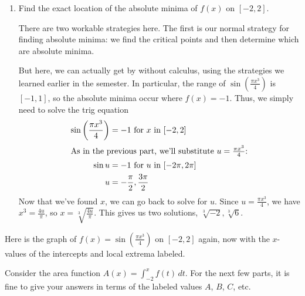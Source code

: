 \documentclass{article}
\begin{document}
\begin{enumerate}
\begin{enumerate}
\begin{solution}
      \begin{checkanswer}
        It should be clear from the given diagram that $0,
        \pm 2$ are $x$-intercepts and that there are 2 more
        $x$-intercepts. 
      \end{checkanswer}
    \end{solution}

  \item
    \begin{problem}[\vfill\newpage]
      Find the exact location of the absolute minima of $f(x)$ on
      $[-2, 2]$.
    \end{problem}

    \begin{solution}
      There are two workable strategies here.  The first is our normal
      strategy for finding absolute minima: we find the critical points
      and then determine which are absolute minima.

      But here, we can actually get by without calculus, using the
      strategies we learned earlier in the semester.  In particular, the
      range of $\sin \left( \frac{\pi x^3}{4} \right)$ is $[-1, 1]$, so
      the absolute minima occur where $f(x) = -1$.  Thus, we simply need
      to solve the trig equation
      \begin{align*}
        \sin \left( \frac{\pi x^3}{4} \right) &= - 1 \text{ for $x$ in }
        [-2, 2] \\
        \intertext{As in the previous part, we'll substitute $u =
          \frac{\pi x^3}{4}$:}
        \sin u &= -1 \text{ for $u$ in $[-2\pi, 2 \pi]$} \\
        u &= - \frac{\pi}{2}, \frac{3 \pi}{2}
      \end{align*}
      Now that we've found $x$, we can go back to solve for $u$.  Since $u
      = \frac{\pi x^3}{4}$, we have $x^3 = \frac{4 u}{\pi}$, so $x =
      \sqrt[3]{ \frac{4u}{\pi} }$.  This gives us two solutions, $\boxed{
        \sqrt[3]{-2}, \sqrt[3]{6}}$.
    \end{solution}

  \end{enumerate}

  Here is the graph of $\displaystyle f(x) = \sin \left( \frac{\pi x^3}{4}
  \right)$ on $[-2, 2]$ again, now with the $x$-values of the intercepts
  and local extrema labeled.
  \begin{center}
  \end{center}
  Consider the area function $A(x) = \int_{-2}^x
  f(t)\,dt$.  For the next few parts, it is fine to give your answers in
  terms of the labeled values $A$, $B$, $C$, etc. 


\end{enumerate}
\end{document}
